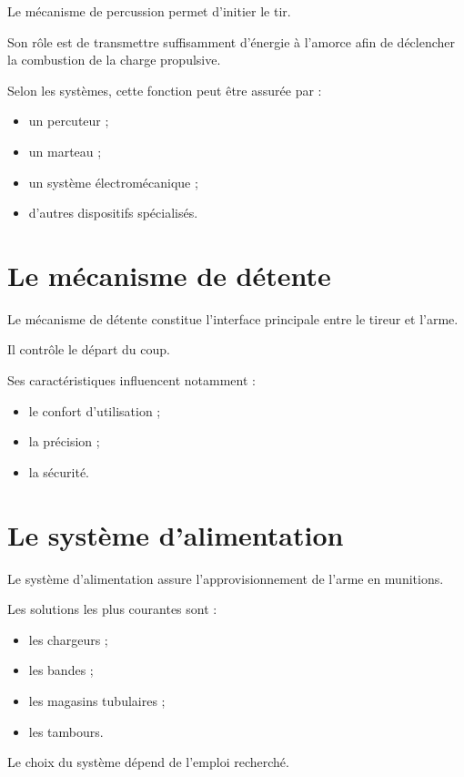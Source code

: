 Le mécanisme de percussion permet d'initier le tir.

Son rôle est de transmettre suffisamment d'énergie à l'amorce afin de
déclencher la combustion de la charge propulsive.

Selon les systèmes, cette fonction peut être assurée par :

\begin{itemize}
    \item un percuteur ;
    \item un marteau ;
    \item un système électromécanique ;
    \item d'autres dispositifs spécialisés.
\end{itemize}

\section{Le mécanisme de détente}

Le mécanisme de détente constitue l'interface principale entre le tireur et
l'arme.

Il contrôle le départ du coup.

Ses caractéristiques influencent notamment :

\begin{itemize}
    \item le confort d'utilisation ;
    \item la précision ;
    \item la sécurité.
\end{itemize}

\section{Le système d'alimentation}

Le système d'alimentation assure l'approvisionnement de l'arme en munitions.

Les solutions les plus courantes sont :

\begin{itemize}
    \item les chargeurs ;
    \item les bandes ;
    \item les magasins tubulaires ;
    \item les tambours.
\end{itemize}

Le choix du système dépend de l'emploi recherché.

